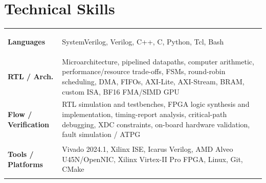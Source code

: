 \documentclass[letterpaper,10pt]{article}
\newcommand{\skillrow}[2]{\textbf{#1} & #2 \\[2.5pt]}
\begin{document}
\section{Technical Skills}
\vspace{1pt}
\begin{tabular}{@{}>{\bfseries\raggedright\arraybackslash}p{}@{\hspace{8pt}}>{\raggedright\arraybackslash}p{}@{}}
\skillrow{Languages}{SystemVerilog, Verilog, C++, C, Python, Tcl, Bash}
\skillrow{RTL / Arch.}{Microarchitecture, pipelined datapaths, computer arithmetic, performance/resource trade-offs, FSMs, round-robin scheduling, DMA, FIFOs, AXI-Lite, AXI-Stream, BRAM, custom ISA, BF16 FMA/SIMD GPU}
\skillrow{Flow / Verification}{RTL simulation and testbenches, FPGA logic synthesis and implementation, timing-report analysis, critical-path debugging, XDC constraints, on-board hardware validation, fault simulation / ATPG}
\skillrow{Tools / Platforms}{Vivado 2024.1, Xilinx ISE, Icarus Verilog, AMD Alveo U45N/OpenNIC, Xilinx Virtex-II Pro FPGA, Linux, Git, CMake}
\end{tabular}
\end{document}
